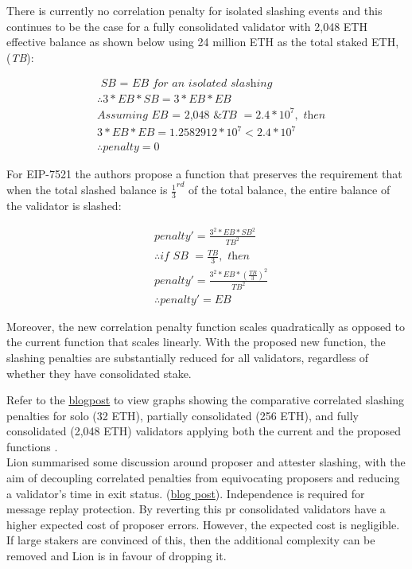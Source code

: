 There is currently no correlation penalty for isolated slashing events and this continues to be the case for a fully consolidated validator with 2,048 ETH effective balance as shown below using 24 million ETH as the total staked ETH, (\textit{TB}):

\begin{equation*}
\begin{split}
& \textit{ SB = EB for an isolated slashing} \\
& \therefore  3*EB*SB =  3*EB*EB \\
& \textit{Assuming EB = 2,048 \& TB } = 2.4 * 10^7, \textit{ then} \\
& 3*EB*EB = 1.2582912 * 10^7 < 2.4 * 10^7 \\
& \therefore penalty = 0
\end{split}
\end{equation*}

For EIP-7521 the authors propose a function that preserves the requirement that when the total slashed balance is $\frac{1}{3}^{rd}$ of the total balance, the entire balance of the validator is slashed:

\begin{equation*}
\begin{split}
& penalty' = \frac{3^2 * EB * SB^2}{TB^2} \\
& \therefore \textit{if SB } = \frac{TB}{3}, \textit{ then} \\
& penalty' =   \frac{3^2 * EB * \left(  \frac{TB}{3} \right)^2 }{TB^2} \\
& \therefore penalty' = EB
\end{split}
\end{equation*}

Moreover, the new correlation penalty function scales quadratically as opposed to the current function that scales linearly. With the proposed new function, the slashing penalties are substantially reduced for all validators, regardless of whether they have consolidated stake.

Refer to the \href{https://notes.ethereum.org/@mikeneuder/slashings-eip-7251}{blogpost} to view graphs showing the comparative correlated slashing penalties for solo (32 ETH), partially consolidated (256 ETH), and fully consolidated (2,048 ETH) validators applying both the current and the proposed functions \cite{Neuder2023d}. \\

Lion summarised some discussion around proposer and attester slashing, with the aim of decoupling correlated penalties from equivocating proposers and reducing a validator's time in exit status. (\href{https://hackmd.io/@dapplion/S1pGYKR_T}{blog post}). Independence is required for message replay protection. By reverting this \gls{pr} consolidated validators have a higher expected cost of proposer errors. However, the expected cost is negligible. If large stakers are convinced of this, then the additional complexity can be removed and Lion is in favour of dropping it.

